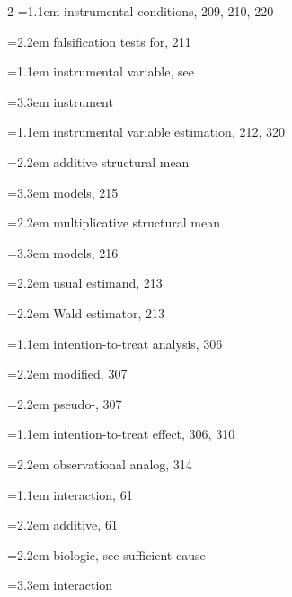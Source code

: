 \begin{multicols}{2}
\hangindent=1.1em instrumental conditions, 209, 210, 220\par
\hspace*{1.1em}\hangindent=2.2em falsification tests for, 211\par
\hangindent=1.1em instrumental variable, see\par
\hspace*{2.2em}\hangindent=3.3em instrument\par
\hangindent=1.1em instrumental variable estimation, 212, 320\par
\hspace*{1.1em}\hangindent=2.2em additive structural mean\par
\hspace*{2.2em}\hangindent=3.3em models, 215\par
\hspace*{1.1em}\hangindent=2.2em multiplicative structural mean\par
\hspace*{2.2em}\hangindent=3.3em models, 216\par
\hspace*{1.1em}\hangindent=2.2em usual estimand, 213\par
\hspace*{1.1em}\hangindent=2.2em Wald estimator, 213\par
\hangindent=1.1em intention-to-treat analysis, 306\par
\hspace*{1.1em}\hangindent=2.2em modified, 307\par
\hspace*{1.1em}\hangindent=2.2em pseudo-, 307\par
\hangindent=1.1em intention-to-treat effect, 306, 310\par
\hspace*{1.1em}\hangindent=2.2em observational analog, 314\par
\hangindent=1.1em interaction, 61\par
\hspace*{1.1em}\hangindent=2.2em additive, 61\par
\hspace*{1.1em}\hangindent=2.2em biologic, see sufficient cause\par
\hspace*{2.2em}\hangindent=3.3em interaction\par

\end{multicols}
